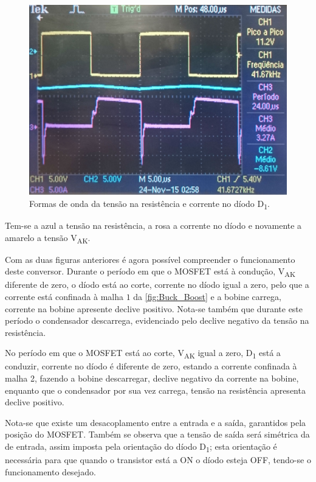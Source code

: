 \documentclass[a4paper,11pt]{article}
\numberwithin{equation}{section}
\begin{document}
\begin{figure}[H]
	\centering
	\includegraphics[keepaspectratio=true, scale=0.14]{img/figs/tensao_resistencia_corrente_d1_buck_boost}
	\caption{Formas de onda da tensão na resistência e corrente no díodo D\textsubscript{1}.}
	\label{fig:tensao_resistencia_corrente_d1_buck_boost}
	\vspace{-0.8em}
\end{figure}

Tem-se a azul a tensão na resistência, a rosa a corrente no díodo e novamente a amarelo a tensão V\textsubscript{AK}.

Com as duas figuras anteriores é agora possível compreender o funcionamento deste conversor. Durante o período em que o MOSFET está à condução, V\textsubscript{AK} diferente de zero, o díodo está ao corte, corrente no díodo igual a zero, pelo que a corrente está confinada à malha $1$ da \autoref{fig:Buck_Boost} e a bobine carrega, corrente na bobine apresente declive positivo. Nota-se também que durante este período o condensador descarrega, evidenciado pelo declive negativo da tensão na resistência.

No período em que o MOSFET está ao corte, V\textsubscript{AK} igual a zero, D\textsubscript{1} está a conduzir, corrente no díodo é diferente de zero, estando a corrente confinada à malha 2, fazendo a bobine descarregar, declive negativo da corrente na bobine, enquanto que o condensador por sua vez carrega, tensão na resistência apresenta declive positivo.

Nota-se que existe um desacoplamento entre a entrada e a saída, garantidos pela posição do MOSFET. Também se observa que a tensão de saída será simétrica da de entrada, assim imposta pela orientação do díodo D\textsubscript{1}; esta orientação é necessária para que quando o transistor está a ON o díodo esteja OFF, tendo-se o funcionamento desejado.
\end{document}
